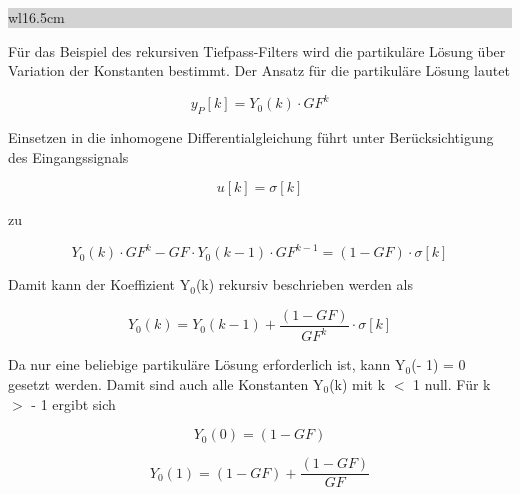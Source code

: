 \clearpage

\noindent
\colorbox{lightgray}{%
%
\renewcommand\arraystretch{0.6}%
\begin{tabular}{ wl{16.5cm} }
{}
\end{tabular}%
}\medskip

\noindent F\"{u}r das Beispiel des rekursiven Tiefpass-Filters wird die partikul\"{a}re L\"{o}sung \"{u}ber Variation der Konstanten bestimmt. Der Ansatz f\"{u}r die partikul\"{a}re L\"{o}sung lautet

\begin{equation}\label{eq:foursixty}
y_{P} \left[k\right]=Y_{0} \left(k\right)\cdot GF^{k} 
\end{equation}

\noindent Einsetzen in die inhomogene Differentialgleichung f\"{u}hrt unter Ber\"{u}cksichtigung des Eingangssignals 

\begin{equation}\label{eq:foursixtyone}
u\left[k\right]=\sigma \left[k\right]
\end{equation}

\noindent zu

\begin{equation}\label{eq:foursixtytwo}
Y_{0} \left(k\right)\cdot GF^{k} -GF\cdot Y_{0} \left(k-1\right)\cdot GF^{k-1} =\left(1-GF\right)\cdot \sigma \left[k\right]
\end{equation}

\noindent Damit kann der Koeffizient Y${}_{0}$(k) rekursiv beschrieben werden als

\begin{equation}\label{eq:foursixtythree}
Y_{0} \left(k\right)=Y_{0} \left(k-1\right)+\frac{\left(1-GF\right)}{GF^{k} } \cdot \sigma \left[k\right]
\end{equation}

\noindent Da nur eine beliebige partikul\"{a}re L\"{o}sung erforderlich ist, kann Y${}_{0}$(- 1) = 0 gesetzt werden. Damit sind auch alle Konstanten Y${}_{0}$(k) mit k $\mathrm{<}$ 1 null. F\"{u}r k $\mathrm{>}$ - 1 ergibt sich

\begin{equation}\label{eq:foursixtyfour}
Y_{0} \left(0\right)=\left(1-GF\right)
\end{equation}

\begin{equation}\label{eq:foursixtyfive}
Y_{0} \left(1\right)=\left(1-GF\right)+\frac{\left(1-GF\right)}{GF}
\end{equation}

